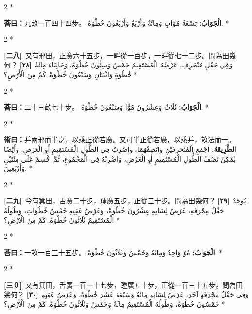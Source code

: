 \documentclass[11pt,a4paper]{article}
\newcommand{\ar}[1]{\arabicfont\beginR #1\endR}
\newcommand{\problemnum}[1]{\textbf{[\ignorespaces#1\unskip]}}
\newenvironment{bilingual}{%
  \begin{paracol}{2}%
  \switchcolumn[0]*%
}{%
  \end{paracol}%
}
\newcommand{\cnline}[1]{\switchcolumn[0]\noindent #1 \switchcolumn[1]}
\newcommand{\arline}[1]{\noindent\ar{#1} \switchcolumn[0]*}
\newenvironment{prob bilingual}{%
  \begin{paracol}{2}%
  \switchcolumn[0]*%
}{%
  \end{paracol}%
  \vspace{0.3em}%
}
\begin{document}
\begin{bilingual}
\cnline{\textcolor{answercolor}{\textbf{荅曰：}}九畝一百四十四步。}
\arline{\textcolor{answercolor}{\textbf{الْجَوَابُ:}} تِسْعَةُ مُوّاتٍ وَمِائَةٌ وَأَرْبَعٌ وَأَرْبَعُونَ خُطْوَةً.}
\end{bilingual}

\begin{bilingual}
\cnline{\problemnum{二八}\, 又有邪田，正廣六十五步，一畔從一百步，一畔從七十二步。問為田幾何？}
\arline{\problemnum{٢٨}\, وَفِي حَقْلٍ مُنْحَرِفٍ، عَرْضُهُ الْمُسْتَقِيمُ خَمْسٌ وَسِتُّونَ خُطْوَةً، وَجَانِبَاهُ مِائَةُ خُطْوَةٍ وَاثْنَتَانِ وَسَبْعُونَ خُطْوَةً. كَمْ مِنَ الْأَرْضِ؟}
\end{bilingual}

\begin{bilingual}
\cnline{\textcolor{answercolor}{\textbf{荅曰：}}二十三畝七十步。}
\arline{\textcolor{answercolor}{\textbf{الْجَوَابُ:}} ثَلَاثٌ وَعِشْرُونَ مُوًّا وَسَبْعُونَ خُطْوَةً.}
\end{bilingual}

\begin{bilingual}
\cnline{%
\textcolor{methodcolor}{\textbf{術曰：}}并兩邪而半之，以乘正從若廣。又可半正從若廣，以乘并，畝法而一。
}
\arline{%
\textcolor{methodcolor}{\textbf{الطَّرِيقَةُ:}} اجْمَعِ الْمُنْحَرِفَيْنِ وَانْصِفْهُمَا، وَاضْرِبْ فِي الطُّولِ الْمُسْتَقِيمِ أَوِ الْعَرْضِ. وَأَيْضًا يُمْكِنُ نَصْفُ الطُّولِ الْمُسْتَقِيمِ أَوِ الْعَرْضِ، وَاضْرِبْهُ فِي الْمَجْمُوعِ، ثُمَّ اقْسِمْ عَلَى مِئَتَيْنِ وَأَرْبَعِينَ.
}
\end{bilingual}

\begin{bilingual}
\cnline{\problemnum{二九}\, 今有箕田，舌廣二十步，踵廣五步，正從三十步。問為田幾何？}
\arline{\problemnum{٢٩}\, يُوجَدُ حَقْلُ مِجْرَفَةٍ، عَرْضُ لِسَانِهِ عِشْرُونَ خُطْوَةً، وَعَرْضُ عَقِبِهِ خَمْسُ خُطُوَاتٍ، وَطُولُهُ الْمُسْتَقِيمُ ثَلَاثُونَ خُطْوَةً. كَمْ مِنَ الْأَرْضِ؟}
\end{bilingual}

\begin{bilingual}
\cnline{\textcolor{answercolor}{\textbf{荅曰：}}一畝一百三十五步。}
\arline{\textcolor{answercolor}{\textbf{الْجَوَابُ:}} مُوّ وَاحِدٌ وَمِائَةٌ وَخَمْسٌ وَثَلَاثُونَ خُطْوَةً.}
\end{bilingual}

\begin{bilingual}
\cnline{\problemnum{三０}\, 又有箕田，舌廣一百一十七步，踵廣五十步，正從一百三十五步。問為田幾何？}
\arline{\problemnum{٣٠}\, وَفِي حَقْلُ مِجْرَفَةٍ آخَرَ، عَرْضُ لِسَانِهِ مِائَةٌ وَسَبْعَةَ عَشَرَ خُطْوَةً، وَعَرْضُ عَقِبِهِ خَمْسُونَ خُطْوَةً، وَطُولُهُ الْمُسْتَقِيمُ مِائَةٌ وَخَمْسٌ وَثَلَاثُونَ خُطْوَةً. كَمْ مِنَ الْأَرْضِ؟}
\end{bilingual}
\end{document}
